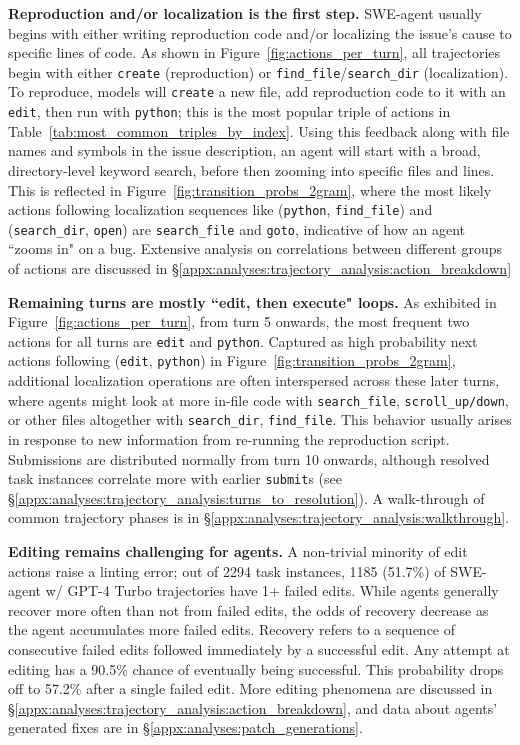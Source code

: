 \textbf{Reproduction and/or localization is the first step.}
SWE-agent usually begins with either writing reproduction code and/or localizing the issue's cause to specific lines of code.
As shown in Figure~\ref{fig:actions_per_turn}, all trajectories begin with either \texttt{create} (reproduction) or \texttt{find\_file}/\texttt{search\_dir} (localization).
To reproduce, models will \texttt{create} a new file, add reproduction code to it with an \texttt{edit}, then run with \texttt{python}; this is the most popular triple of actions in Table~\ref{tab:most_common_triples_by_index}.
Using this feedback along with file names and symbols in the issue description, an agent will start with a broad, directory-level keyword search, before then zooming into specific files and lines.
This is reflected in Figure~\ref{fig:transition_probs_2gram}, where the most likely actions following localization sequences like (\texttt{python}, \texttt{find\_file}) and (\texttt{search\_dir}, \texttt{open}) are \texttt{search\_file} and \texttt{goto}, indicative of how an agent ``zooms in" on a bug.
Extensive analysis on correlations between different groups of actions are discussed in \S\ref{appx:analyses:trajectory_analysis:action_breakdown}

\textbf{Remaining turns are mostly ``edit, then execute" loops.}
As exhibited in Figure~\ref{fig:actions_per_turn}, from turn \num{5} onwards, the most frequent two actions for all turns are \texttt{edit} and \texttt{python}.
Captured as high probability next actions following (\texttt{edit}, \texttt{python}) in Figure~\ref{fig:transition_probs_2gram}, additional localization operations are often interspersed across these later turns, where agents might look at more in-file code with \texttt{search\_file}, \texttt{scroll\_up/down}, or other files altogether with \texttt{search\_dir}, \texttt{find\_file}.
This behavior usually arises in response to new information from re-running the reproduction script.
Submissions are distributed normally from turn \num{10} onwards, although resolved task instances correlate more with earlier \texttt{submit}s (see \S\ref{appx:analyses:trajectory_analysis:turns_to_resolution}).
A walk-through of common trajectory phases is in \S\ref{appx:analyses:trajectory_analysis:walkthrough}.

\textbf{Editing remains challenging for agents.}
A non-trivial minority of edit actions raise a linting error; out of \num{2294} task instances, \num{1185} (\num{51.7}\%) of SWE-agent w/ GPT-4 Turbo trajectories have \num{1}+ failed edits.
While agents generally recover more often than not from failed edits, the odds of recovery decrease as the agent accumulates more failed edits.
Recovery refers to a sequence of consecutive failed edits followed immediately by a successful edit.
Any attempt at editing has a \num{90.5}\% chance of eventually being successful.
This probability drops off to \num{57.2}\% after a single failed edit.
More editing phenomena are discussed in \S\ref{appx:analyses:trajectory_analysis:action_breakdown}, and data about agents' generated fixes are in \S\ref{appx:analyses:patch_generations}.

